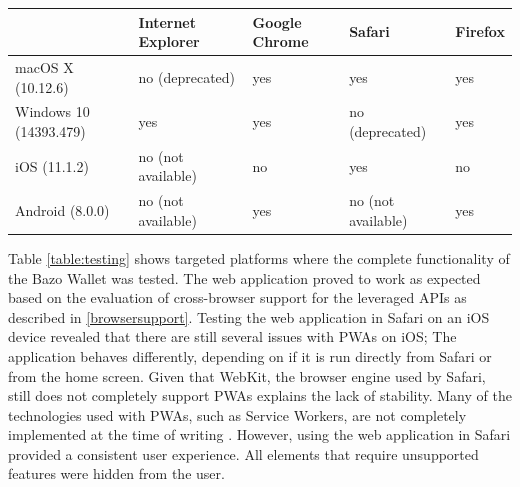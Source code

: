 \begin{center}
    \begin{tabular}{ | l | l | l | l | p{2cm} |}
    \hline
      & Internet Explorer & Google Chrome & Safari & Firefox \\ \hline
    macOS X (10.12.6)  & no (deprecated) & yes & yes & yes \\ \hline
    Windows 10 (14393.479)  & yes & yes & no (deprecated) & yes \\ \hline    
    iOS (11.1.2)  & no (not available) & no & yes & no \\ \hline
    Android (8.0.0)  & no (not available) & yes & no (not available) & yes \\ \hline
    \end{tabular}
    \label{table:testing}
    \end{center}
Table \ref{table:testing} shows targeted platforms where the complete functionality of the Bazo Wallet was tested. The web application proved to work as expected based on the evaluation of cross-browser support for the leveraged APIs as described in \ref{browsersupport}. Testing the web application in Safari on an iOS device revealed that there are still several issues with PWAs on iOS; The application behaves differently, depending on if it is run directly from Safari or from the home screen. Given that WebKit, the browser engine used by Safari, still does not completely support PWAs explains the lack of stability. Many of the technologies used with PWAs, such as Service Workers, are not completely implemented at the time of writing \cite{webkitsw}. However, using the web application in Safari provided a consistent user experience. All elements that require unsupported features were hidden from the user.
 
